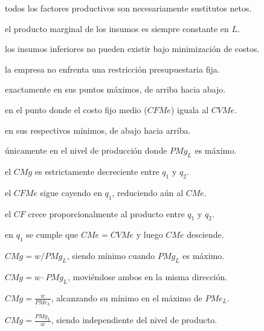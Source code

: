 \begin{opts}
    \item todos los factores productivos son necesariamente sustitutos netos.
    \item el producto marginal de los insumos es siempre constante en $L$.
    \item los insumos inferiores no pueden existir bajo minimización de costos.
    \item la empresa no enfrenta una restricción presupuestaria fija.
\end{opts}

\begin{opts}
    \item exactamente en sus puntos máximos, de arriba hacia abajo.
    \item en el punto donde el costo fijo medio ($CFMe$) iguala al $CVMe$.
    \item en sus respectivos mínimos, de abajo hacia arriba.
    \item únicamente en el nivel de producción donde $PMg_L$ es máximo.
\end{opts}

\begin{opts}
    \item el $CMg$ es estrictamente decreciente entre $q_1$ y $q_2$.
    \item el $CFMe$ sigue cayendo en $q_1$, reduciendo aún al $CMe$.
    \item el $CF$ crece proporcionalmente al producto entre $q_1$ y $q_2$.
    \item en $q_1$ se cumple que $CMe = CVMe$ y luego $CMe$ desciende.
\end{opts}

\begin{opts}
    \item $CMg = w/PMg_L$, siendo mínimo cuando $PMg_L$ es máximo.
    \item $CMg = w \cdot PMg_L$, moviéndose ambos en la misma dirección.
    \item $CMg = \frac{w}{PMe_L}$, alcanzando su mínimo en el máximo de $PMe_L$.
    \item $CMg = \frac{PMg_L}{w}$, siendo independiente del nivel de producto.
\end{opts}

